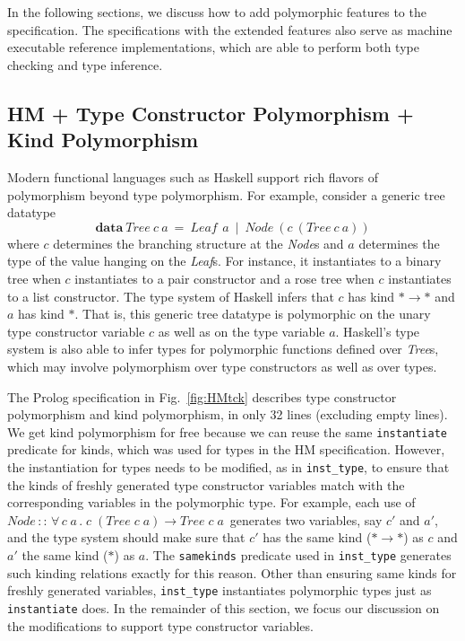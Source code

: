 \documentclass[runningheads,a4paper]{llncs}
\begin{document}
In the following sections, we discuss how to add polymorphic features
to the specification. The specifications with the extended features
also serve as machine executable reference implementations, which
are able to perform both type checking and type inference.





\subsection{HM + Type Constructor Polymorphism + Kind Polymorphism}
\label{ssec:HMtck}
Modern functional languages such as Haskell support rich flavors of
polymorphism beyond type polymorphism. For example, consider
a generic tree datatype
\[ \textbf{data}~\textit{Tree}~c~a
  ~=~ \textit{Leaf}\,~a ~\mid~ \textit{Node}~(c~(\textit{Tree}~c~a)) \]
where $c$ determines the branching structure at the \textit{Node}s and $a$
determines the type of the value hanging on the \textit{Leaf}s. For instance,
it instantiates to a binary tree when $c$ instantiates to a pair constructor
and a rose tree when $c$ instantiates to a list constructor.
The type system of Haskell infers that $c$ has kind $*\to*$ and
$a$ has kind $*$. That is, this generic tree datatype is polymorphic on
the unary type constructor variable $c$ as well as on the type variable $a$.
Haskell's type system is also able to infer types for polymorphic functions
defined over \textit{Tree}s, which may involve polymorphism over
type constructors as well as over types.

The Prolog specification in Fig.~\ref{fig:HMtck} describes
type constructor polymorphism and kind polymorphism, in only 32 lines
(excluding empty lines). We get kind polymorphism for free because
we can reuse the same \verb|instantiate| predicate for kinds, which was
used for types in the HM specification. However, the instantiation for
types needs to be modified, as in \verb|inst_type|, to ensure that
the kinds of freshly generated type constructor variables match with
the corresponding variables in the polymorphic type. For example, each use of
$\textit{Node}\,::\,
 \forall\,c\;a\,.\;c\;(\textit{Tree}\;c\;a)\to\textit{Tree}\;c\;a\,$
generates two variables, say $c'$ and $a'$, and the type system
should make sure that $c'$ has the same kind ($*\to*$) as $c$
and $a'$ the same kind ($*$) as $a$.
The \verb|samekinds| predicate used in \verb|inst_type| generates such
kinding relations exactly for this reason. Other than ensuring same kinds for
freshly generated variables, \verb|inst_type| instantiates polymorphic types
just as \verb|instantiate| does. In the remainder of this section, we focus
our discussion on the modifications to support type constructor variables.
\end{document}
